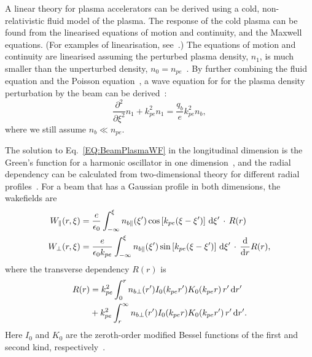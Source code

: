A linear theory for plasma accelerators can be derived using a cold, non-relativistic fluid model of the plasma. The response of the cold plasma can be found from the linearised equations of motion and continuity, and the Maxwell equations. (For examples of linearisation, see~\cite{pecseli:2012,chen:1974}.) The equations of motion and continuity are linearised assuming the perturbed plasma density, $n_{1}$, is much smaller than the unperturbed density, $n_{0} = n_{pe}$~\cite{chen:1987}. By further combining the fluid equation and the Poisson equation~\cite{katsouleas:1987}, a wave equation for for the plasma density perturbation by the beam can be derived~\cite{chen:1987,muggli:2017}:
\begin{equation}
    \frac{\partial^{2}}{\partial\xi^{2}}n_{1} + k_{pe}^{2}n_{1} = \frac{q_{b}}{e}k_{pe}^{2}n_{b}, \label{EQ:BeamPlasmaWF}
\end{equation}
where we still assume $n_{b} \ll n_{pe}$.

The solution to Eq.~\ref{EQ:BeamPlasmaWF} in the longitudinal dimension is the Green’s function for a harmonic oscillator in one dimension~\cite{katsouleas:1987}, and the radial dependency can be calculated from two-dimensional theory for different radial profiles~\cite{chen:1987}. For a beam that has a Gaussian profile in both dimensions, the wakefields are
\begin{align}
    W_{\parallel}(r,\xi) &= \frac{e}{\epsilon_{0}}
        \int_{-\infty}^{\xi} n_{b\parallel}(\xi^{\prime}) \cos\left[k_{pe}(\xi-\xi^{\prime})\right] \,\mathrm{d}\xi^{\prime} \,\cdot\, R(r) \label{EQ:WzFull} \\
    W_{\perp}(r,\xi) &= \frac{e}{\epsilon_{0}k_{pe}}
        \int_{-\infty}^{\xi} n_{b\parallel}(\xi^{\prime}) \sin\left[k_{pe}(\xi-\xi^{\prime})\right] \,\mathrm{d}\xi^{\prime} \,\cdot\, \frac{\mathrm{d}}{\mathrm{d}r}R(r), \label{EQ:WrFull}
\end{align}
where the transverse dependency $R(r)$ is
\begin{align}
    R(r) &= k_{pe}^{2} \int_{0}^{r} n_{b\perp}(r^{\prime}) I_{0}(k_{pe}r^{\prime})
           K_{0}(k_{pe}r) \,r^{\prime}\,\mathrm{d} r^{\prime} \nonumber \\
         &+ k_{pe}^{2} \int_{r}^{\infty} n_{b\perp}(r^{\prime}) I_{0}(k_{pe}r)
           K_{0}(k_{pe}r^{\prime}) \,r^{\prime}\,\mathrm{d} r^{\prime}. \label{EQ:WFRadial}
\end{align}
Here $I_{0}$ and $K_{0}$ are the zeroth-order modified Bessel functions of the first and second kind, respectively~\cite{chen:1987,muggli:2017}.

